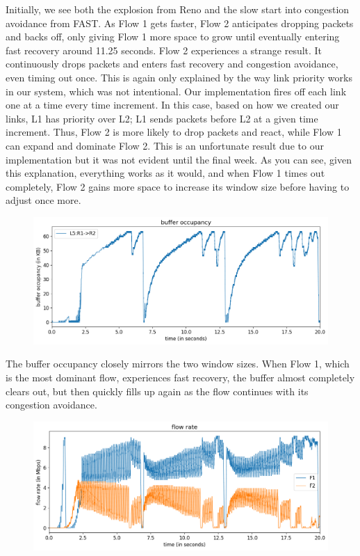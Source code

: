 \documentclass{article}
\begin{document}
Initially, we see both the explosion from Reno and the slow start into congestion avoidance from FAST. As Flow 1 gets faster, Flow 2 anticipates dropping packets and backs off, only giving Flow 1 more space to grow until eventually entering fast recovery around 11.25 seconds. Flow 2 experiences a strange result. It continuously drops packets and enters fast recovery and congestion avoidance, even timing out once. This is again only explained by the way link priority works in our system, which was not intentional. Our implementation fires off each link one at a time every time increment. In this case, based on how we created our links, L1 has priority over L2; L1 sends packets before L2 at a given time increment. Thus, Flow 2 is more likely to drop packets and react, while Flow 1 can expand and dominate Flow 2. This is an unfortunate result due to our implementation but it was not evident until the final week. As you can see, given this explanation, everything works as it would, and when Flow 1 times out completely, Flow 2 gains more space to increase its window size before having to adjust once more.

\begin{figure}[H]
\centering
\includegraphics[width = \textwidth]{"test_case4 buffer occupancy"}
\end{figure}

The buffer occupancy closely mirrors the two window sizes. When Flow 1, which is the most dominant flow, experiences fast recovery, the buffer almost completely clears out, but then quickly fills up again as the flow continues with its congestion avoidance.

\begin{figure}[H]
\centering
\includegraphics[width = \textwidth]{"test_case4 flow rate"}
\end{figure}
\end{document}

